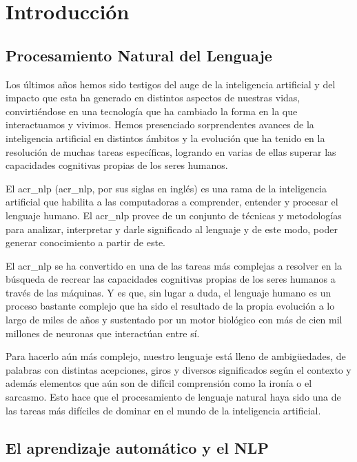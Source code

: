 
\cleardoublepage

\chapter{Introducción}
\label{chapter-introduccion}

\section{Procesamiento Natural del Lenguaje}
\label{section-procesamiento-natural-lenguaje}

Los últimos años hemos sido testigos del auge de la inteligencia artificial y del impacto que esta ha generado en distintos aspectos de nuestras vidas, convirtiéndose en una tecnología que ha cambiado la forma en la que interactuamos y vivimos. Hemos presenciado sorprendentes avances de la inteligencia artificial en distintos ámbitos y la evolución que ha tenido en la resolución de muchas tareas específicas, logrando en varias de ellas superar las capacidades cognitivas propias de los seres humanos. 

El \acrlong{acr_nlp} (\acrshort{acr_nlp}, por sus siglas en inglés) es una rama de la inteligencia artificial que habilita a las computadoras a comprender, entender y procesar el lenguaje humano. El \acrshort{acr_nlp} provee de un conjunto de técnicas y metodologías para analizar, interpretar y darle significado al lenguaje y de este modo, poder generar conocimiento a partir de este. 

El \acrshort{acr_nlp} se ha convertido en una de las tareas más complejas a resolver en la búsqueda de recrear las capacidades cognitivas propias de los seres humanos a través de las máquinas. Y es que, sin lugar a duda, el lenguaje humano es un proceso bastante complejo que ha sido el resultado de la propia evolución a lo largo de miles de años y sustentado por un motor biológico con más de cien mil millones de neuronas que interactúan entre sí. 

Para hacerlo aún más complejo, nuestro lenguaje está lleno de ambigüedades, de palabras con distintas acepciones, giros y diversos significados según el contexto y además elementos que aún son de difícil comprensión como la ironía o el sarcasmo. Esto hace que el procesamiento de lenguaje natural haya sido una de las tareas más difíciles de dominar en el mundo de la inteligencia artificial.
\medskip

\section{El aprendizaje automático y el NLP}
\label{section-antes-de-las-redes-neuronales}


